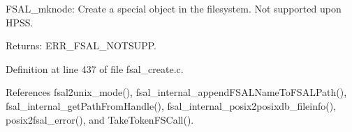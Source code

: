 FSAL\_\-mknode: Create a special object in the filesystem. Not supported upon HPSS.

\begin{Desc}
\item[Returns:]ERR\_\-FSAL\_\-NOTSUPP. \end{Desc}


Definition at line 437 of file fsal\_\-create.c.

References fsal2unix\_\-mode(), fsal\_\-internal\_\-append\-FSALName\-To\-FSALPath(), fsal\_\-internal\_\-get\-Path\-From\-Handle(), fsal\_\-internal\_\-posix2posixdb\_\-fileinfo(), posix2fsal\_\-error(), and Take\-Token\-FSCall().